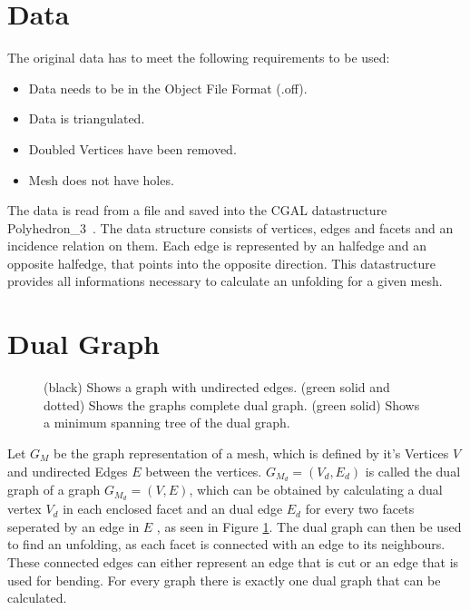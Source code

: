 \documentclass[draft,final]{vutinfth} %
\begin{document}
\section{Data}

The original data has to meet the following requirements to be used:
\begin{itemize}
	\item Data needs to be in the Object File Format (.off)\cite{offfile}.
	\item Data is triangulated.
	\item Doubled Vertices have been removed.
	\item Mesh does not have holes.
\end{itemize}

The data is read from a file and saved into the CGAL datastructure Polyhedron\_3~\cite{cgal:eb-19a}. The data structure consists of vertices, edges and facets and an incidence relation on them. Each edge is represented by an halfedge and an opposite halfedge, that points into the opposite direction. This datastructure provides all informations necessary to calculate an unfolding for a given mesh.

\section{Dual Graph}

\begin{figure}

\caption{(black) Shows a graph with undirected edges. (green solid and dotted) Shows the graphs complete dual graph. (green solid) Shows a minimum spanning tree of the dual graph.}
\label{fig:dualgraph}
\end{figure}

Let $G_M$ be the graph representation of a mesh, which is defined by it's Vertices $V$ and undirected Edges $E$ between the vertices. $G_{M_d} = (V_d, E_d)$ is called the dual graph of a graph $G_{M_d} = (V,E)$, which can be obtained by calculating a dual vertex $V_d$ in each enclosed facet and an dual edge $E_d$ for every two facets seperated by an edge in $E$ \cite{gross2004handbook}, as seen in Figure \ref{fig:dualgraph}. The dual graph can then be used to find an unfolding, as each facet is connected with an edge to its neighbours. These connected edges can either represent an edge that is cut or an edge that is used for bending. For every graph there is exactly one dual graph that can be calculated.
\end{document}
